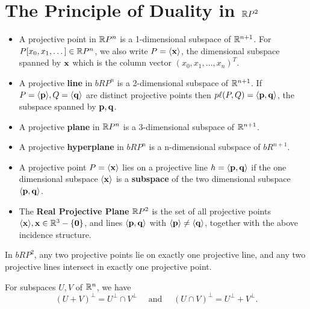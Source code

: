 \section{The Principle of Duality in \(\mathbb{R} P^2\)}

\begin{definition}
    \begin{itemize}
        \item A projective point in \(\mathbb{R} P^n\) is a 1-dimensional subspace of \(\mathbb{R}^{n + 1}\). For \(P[x_0, x_1, \dots] \in \mathbb{R} P^n\), we also write \(P = \langle \mathbf{x} \rangle\), the dimensional subspace spanned by \(\mathbf{x}\) which is the column vector \((x_0, x_1, \dots, x_n)^T\).
        \item A projective \textbf{line} in \(bR P^n\) is a 2-dimensional subspace of \(\mathbb{R}^{n + 1}\). If \(P = \langle \mathbf{p} \rangle, Q = \langle \mathbf{q} \rangle\) are distinct projective points then \(p\ell(P, Q) = \langle \mathbf{p}, \mathbf{q} \rangle\), the subspace spanned by \(\mathbf{p}, \mathbf{q}\).
        \item A projective \textbf{plane} in \(\mathbb{R} P^n\) is a 3-dimensional subspace of \(\mathbb{R}^{n + 1}\).
        \item A projective \textbf{hyperplane} in \(bR P^n\) is a n-dimensional subspace of \(bR^{n + 1}\).
        \item A projective point \(P = \langle \mathbf{x} \rangle\) lies on a projective line \(h = \langle \mathbf{p}, \mathbf{q} \rangle\) if the one dimensional subspace \(\langle \mathbf{x} \rangle\) is a \textbf{subspace} of the two dimensional subspace \(\langle \mathbf{p}, \mathbf{q} \rangle\).
        \item The \textbf{Real Projective Plane} \(\mathbb{R} P^2\) is the set of all projective points \(\langle \mathbf{x} \rangle, \mathbf{x} \in \mathbb{R}^3 - \{ \mathbf{0} \}\), and lines \(\langle \mathbf{p}, \mathbf{q} \rangle\) with \(\langle \mathbf{p} \rangle \neq \langle \mathbf{q} \rangle\), together with the above incidence structure.
    \end{itemize}
\end{definition}

\begin{proposition}
    In \(bR P^2\), any two projective points lie on exactly one projective line, and any two projective lines intersect in exactly one projective point.
\end{proposition}

\begin{lemma}
    For subspaces \(U, V\) of \(\mathbb{R}^n\), we have
    \[(U + V)^\perp = U^\perp \cap V^\perp \quad \text{ and } \quad (U \cap V)^\perp = U^\perp + V^\perp.\]
\end{lemma}

